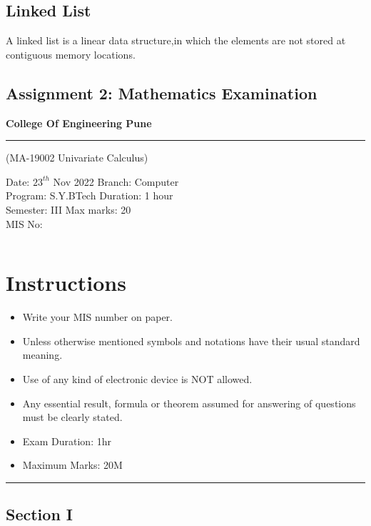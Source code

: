 \documentclass{article}
\begin{document}
\subsection{Linked List}
A linked list is a linear data structure,in which the elements are not stored at contiguous memory locations.

\newpage
\begin{center}
	\section{Assignment 2: Mathematics Examination}
\end{center}
	\begin{center}
	\textbf{\Large College Of Engineering Pune}
	\end{center}
	\rule{\textwidth}{0.4pt}
	\begin{center}
	(MA-19002 Univariate Calculus)
	\end{center}
	Date: $23^{th}$ Nov 2022 \hspace{50 mm} Branch: Computer\\
	Program: S.Y.BTech \hspace{50 mm} Duration: 1 hour\\
	Semester: III \hspace{62 mm} Max marks: 20\\
	MIS No: 
	\begin{table}[h]
	\begin{tabular}{|l|c|c|c|c|c|c|c|c|r|}
	\hline
	 & & & & & & & & & \\
	\hline
	 \end{tabular}
	\end{table}
	\vspace{-6 mm}
	\section*{Instructions}
	\begin{itemize}
	\item Write your MIS number on paper.
	\item Unless otherwise mentioned symbols and notations have their usual standard meaning.
	\item Use of any kind of electronic device is NOT allowed.
	\item Any essential result, formula or theorem assumed for answering of questions must be clearly stated.
	\item Exam Duration: 1hr
	\item Maximum Marks: 20M
	\end{itemize}
	\hrule
	\begin{center}
\section*{Section I}
\end{center}
\end{document}
